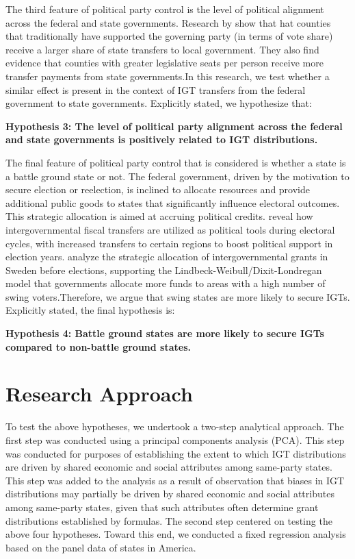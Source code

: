 The third feature of political party control is the level of political alignment across the federal and state governments. Research by \textcite{ansolabehere2006party} show that hat counties that traditionally have supported the governing party (in terms of vote share) receive a larger share of
state transfers to local government. They also find evidence that counties with greater legislative seats per person receive more transfer payments from state governments\parencite{ansolabehere2002equal}.In this research, we test whether a similar effect is present in the context of IGT transfers from the federal government to state governments. Explicitly stated, we hypothesize that:


\textbf{Hypothesis 3: The level of political party alignment across the federal and state governments is positively related to IGT distributions.}

The final feature of political party control that is considered is whether a state is a battle ground state or not. The federal government, driven by the motivation to secure election or reelection, is inclined to allocate resources and provide additional public goods to states that significantly influence electoral outcomes. This strategic allocation is aimed at accruing political credits. \textcite{veiga2013intergovernmental} reveal how intergovernmental fiscal transfers are utilized as political tools during electoral cycles, with increased transfers to certain regions to boost political support in election years. \textcite{dahlberg2002vote} analyze the strategic allocation of intergovernmental grants in Sweden before elections, supporting the Lindbeck-Weibull/Dixit-Londregan model that governments allocate more funds to areas with a high number of swing voters.Therefore, we argue that swing states are more likely to secure IGTs. Explicitly stated, the final hypothesis is:

\textbf{Hypothesis 4: Battle ground states are more likely to secure IGTs compared to non-battle ground states.}


\section{Research Approach}


To test the above hypotheses, we undertook a two-step analytical approach. The first step was conducted using a principal components analysis (PCA). This step was conducted for purposes of establishing the extent to which IGT distributions are driven by shared economic and social
attributes among same-party states. This step was added to the analysis as a result of \textcite{martin2018dividing} observation that biases in IGT distributions may partially be driven by shared economic and
social attributes among same-party states, given that such attributes often determine grant distributions established by formulas. The second step centered on testing the above four hypotheses. Toward this end, we conducted a fixed regression analysis based on the panel data of states in America.


